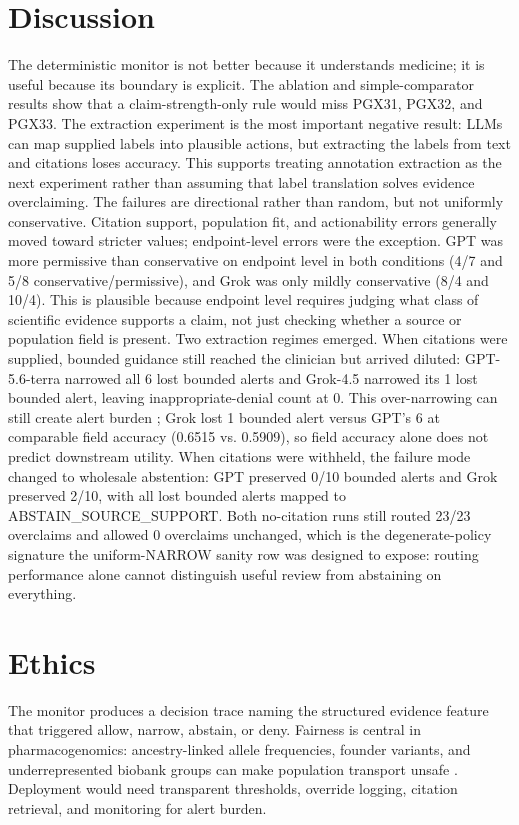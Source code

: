 \documentclass[pmlr,twocolumn,10pt]{jmlr}
\begin{document}
\section{Discussion}
The deterministic monitor is not better because it understands medicine; it is useful because its boundary is explicit.
The ablation and simple-comparator results show that a claim-strength-only rule would miss PGX31, PGX32, and PGX33.
The extraction experiment is the most important negative result: LLMs can map supplied labels into plausible actions, but extracting the labels from text and citations loses accuracy.
This supports treating annotation extraction as the next experiment rather than assuming that label translation solves evidence overclaiming.
The failures are directional rather than random, but not uniformly conservative.
Citation support, population fit, and actionability errors generally moved toward stricter values; endpoint-level errors were the exception.
GPT was more permissive than conservative on endpoint level in both conditions (4/7 and 5/8 conservative/permissive), and Grok was only mildly conservative (8/4 and 10/4).
This is plausible because endpoint level requires judging what class of scientific evidence supports a claim, not just checking whether a source or population field is present.
Two extraction regimes emerged.
When citations were supplied, bounded guidance still reached the clinician but arrived diluted: GPT-5.6-terra narrowed all 6 lost bounded alerts and Grok-4.5 narrowed its 1 lost bounded alert, leaving inappropriate-denial count at 0.
This over-narrowing can still create alert burden \citep{ancker2017alertfatigue}; Grok lost 1 bounded alert versus GPT's 6 at comparable field accuracy (0.6515 vs. 0.5909), so field accuracy alone does not predict downstream utility.
When citations were withheld, the failure mode changed to wholesale abstention: GPT preserved 0/10 bounded alerts and Grok preserved 2/10, with all lost bounded alerts mapped to ABSTAIN\_SOURCE\_SUPPORT.
Both no-citation runs still routed 23/23 overclaims and allowed 0 overclaims unchanged, which is the degenerate-policy signature the uniform-NARROW sanity row was designed to expose: routing performance alone cannot distinguish useful review from abstaining on everything.

\section{Ethics}
The monitor produces a decision trace naming the structured evidence feature that triggered allow, narrow, abstain, or deny.
Fairness is central in pharmacogenomics: ancestry-linked allele frequencies, founder variants, and underrepresented biobank groups can make population transport unsafe \citep{clinpgxhla,genomeindia,allofus}.
Deployment would need transparent thresholds, override logging, citation retrieval, and monitoring for alert burden.
\end{document}
